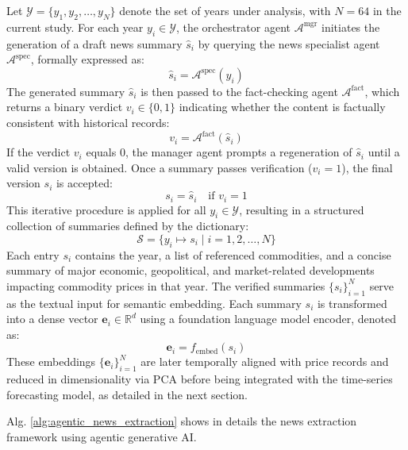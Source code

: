 \documentclass[12pt]{elsarticle}
\begin{document}
Let $\mathcal{Y} = \{y_1, y_2, \dots, y_N\}$ denote the set of years under analysis, with $N=64$ in the current study. For each year $y_i \in \mathcal{Y}$, the orchestrator agent $\mathcal{A}^{\text{mgr}}$ initiates the generation of a draft news summary $\hat{s}_i$ by querying the news specialist agent $\mathcal{A}^{\text{spec}}$, formally expressed as:
\begin{equation}
\hat{s}_i = \mathcal{A}^{\text{spec}}(y_i)
\end{equation}
The generated summary $\hat{s}_i$ is then passed to the fact-checking agent $\mathcal{A}^{\text{fact}}$, which returns a binary verdict $v_i \in \{0, 1\}$ indicating whether the content is factually consistent with historical records:
\begin{equation}
v_i = \mathcal{A}^{\text{fact}}(\hat{s}_i)
\end{equation}
If the verdict $v_i$ equals 0, the manager agent prompts a regeneration of $\hat{s}_i$ until a valid version is obtained. Once a summary passes verification ($v_i = 1$), the final version $s_i$ is accepted:
\begin{equation}
s_i = \hat{s}_i \quad \text{if } v_i = 1
\end{equation}
This iterative procedure is applied for all $y_i \in \mathcal{Y}$, resulting in a structured collection of summaries defined by the dictionary:
\begin{equation}
\mathcal{S} = \{ y_i \mapsto s_i \mid i = 1, 2, \dots, N \}
\end{equation}
Each entry $s_i$ contains the year, a list of referenced commodities, and a concise summary of major economic, geopolitical, and market-related developments impacting commodity prices in that year.
The verified summaries $\{s_i\}_{i=1}^N$ serve as the textual input for semantic embedding. Each summary $s_i$ is transformed into a dense vector $\mathbf{e}_i \in \mathbb{R}^d$ using a foundation language model encoder, denoted as:
\begin{equation}
\mathbf{e}_i = f_{\text{embed}}(s_i)
\end{equation}
These embeddings $\{\mathbf{e}_i\}_{i=1}^N$ are later temporally aligned with price records and reduced in dimensionality via PCA before being integrated with the time-series forecasting model, as detailed in the next section.

Alg. \ref{alg:agentic_news_extraction} shows in details the news extraction framework using agentic generative AI.
\end{document}
